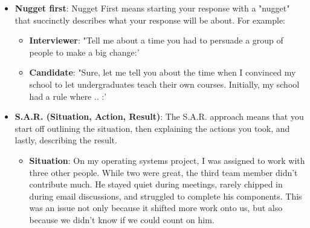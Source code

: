 \documentclass{report}
\begin{document}
\begin{itemize}
\begin{itemize}
                    \bigbreak \noindent 
                    Stay light on details and just state the key points. When possible, try to translate it or at least explain the impact. You can always offer the interviewer the opportunity to drill in further.
                \item \textbf{Focus on yourself, not your team}: Interviews are fundamentally an individual assessment. Unfortunately, when you listen to many candidates (especially those in leadership roles), their answers are about "we'; "us'; and "the team:' The interviewer walks away having little idea what the candidate's actual impact was and might conclude that the candidate did little.
                    \bigbreak \noindent 
                    Pay attention to your answers. Listen for how much you say "we" versus 'T' Assume that every question is about your role, and speak to that.
                \item \textbf{Give structured answers}: There are two common ways to think about structuring responses to a behavioral question: nugget first and S.A.R. These techniques can be used separately or together
            \end{itemize}
        \item \textbf{Nugget first}: Nugget First means starting your response with a "nugget" that succinctly describes what your response will be about. 
            \bigbreak \noindent 
            For example:
            \begin{itemize}
                \item \textbf{Interviewer}: "Tell me about a time you had to persuade a group of people to make a big change:' 
                \item \textbf{Candidate}: "Sure, let me tell you about the time when I convinced my school to let undergraduates teach their own courses. Initially, my school had a rule where .. :' 
            \end{itemize}
        \item \textbf{S.A.R. (Situation, Action, Result)}: The S.A.R. approach means that you start off outlining the situation, then explaining the actions you took, and lastly, describing the result. 
            \begin{itemize}
                \item \textbf{Situation}: On my operating systems project, I was assigned to work with three other people. While two were great, the third team member didn't contribute much. He stayed quiet during meetings, rarely chipped in during email discussions, and struggled to complete his components. This was an issue not only because it shifted more work onto us, but also because we didn't know if we could count on him. 

\end{itemize}
\end{itemize}
\end{document}
